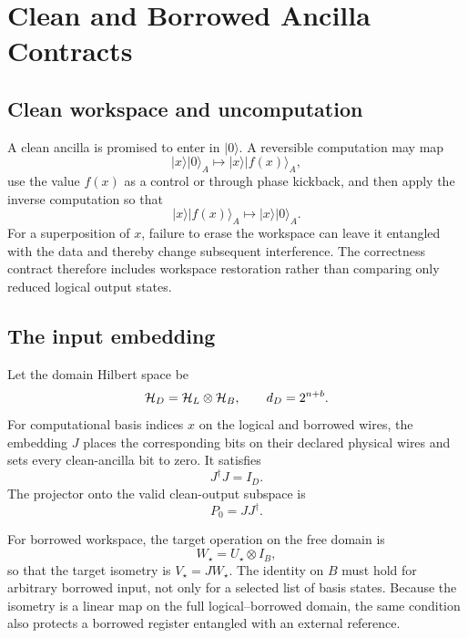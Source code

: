 \section{Clean and Borrowed Ancilla Contracts}
\label{sec:ancilla-contract}

\subsection{Clean workspace and uncomputation}

A clean ancilla is promised to enter in $\lvert0\rangle$. A reversible computation may map
\begin{equation}
\lvert x\rangle\lvert0\rangle_A
\longmapsto
\lvert x\rangle\lvert f(x)\rangle_A,
\end{equation}
use the value $f(x)$ as a control or through phase kickback, and then apply the inverse computation so that
\begin{equation}
\lvert x\rangle\lvert f(x)\rangle_A
\longmapsto
\lvert x\rangle\lvert0\rangle_A.
\end{equation}
For a superposition of $x$, failure to erase the workspace can leave it entangled with the data and thereby change subsequent interference. The correctness contract therefore includes workspace restoration rather than comparing only reduced logical output states.

\subsection{The input embedding}

Let the domain Hilbert space be
\begin{equation}
\mathcal{H}_D=\mathcal{H}_L\otimes\mathcal{H}_B,
\qquad d_D=2^{n+b}.
\end{equation}
For computational basis indices $x$ on the logical and borrowed wires, the embedding $J$ places the corresponding bits on their declared physical wires and sets every clean-ancilla bit to zero. It satisfies
\begin{equation}
J^\dagger J=I_D.
\end{equation}
The projector onto the valid clean-output subspace is
\begin{equation}
P_0=JJ^\dagger.
\label{eq:clean-projector}
\end{equation}

For borrowed workspace, the target operation on the free domain is
\begin{equation}
W_\star=U_\star\otimes I_B,
\label{eq:domain-target}
\end{equation}
so that the target isometry is $V_\star=JW_\star$. The identity on $B$ must hold for arbitrary borrowed input, not only for a selected list of basis states. Because the isometry is a linear map on the full logical--borrowed domain, the same condition also protects a borrowed register entangled with an external reference.

